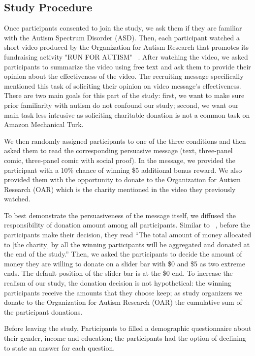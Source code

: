 \subsection{Study Procedure} 
\label{sub:Study Procedure}
Once participants consented to join the study, we ask them if they are familiar with the Autism Spectrum Disorder (ASD). Then, each participant watched a short video produced by the Organization for Autism Research that promotes its fundraising activity "RUN FOR AUTISM" ~\cite{youtube_research}. After watching the video, we asked participants to summarize the video using free text and ask them to provide their opinion about the effectiveness of the video. The recruiting message specifically mentioned this task of soliciting their opinion on video message's effectiveness. There are two main goals for this part of the study: first, we want to make sure prior familiarity with autism do not confound our study; second, we want our main task less intrusive as soliciting charitable donation is not a common task on Amazon Mechanical Turk.  

We then randomly assigned participants to one of the three conditions and then asked them to read the corresponding persuasive message (text, three-panel comic, three-panel comic with social proof). In the message, we provided the participant with a 10\% chance of winning \$5 additional bonus reward. We also provided them with the opportunity to donate to the Organization for Autism Research (OAR) which is the charity mentioned in the video they previously watched. 

To best demonstrate the persuasiveness of the message itself, we diffused the responsibility of donation amount among all participants. Similar to ~\textcite{lee2013does}, before the participants make their decision, they read ``The total amount of money allocated to [the charity] by all the winning participants will be aggregated and donated at the end of the study.'' Then, we asked the participants to decide the amount of money they are willing to donate on a slider bar with \$0 and \$5 as two extreme ends. The default position of the slider bar is at the \$0 end. To increase the realism of our study, the donation decision is not hypothetical: the winning participants receive the amounts that they choose keep; as study organizers we donate to the Organization for Autism Research (OAR) the cumulative sum of the participant donations. 

Before leaving the study, Participants to filled a demographic questionnaire about their gender, income and education; the participants had the option of declining to state an answer for each question.

